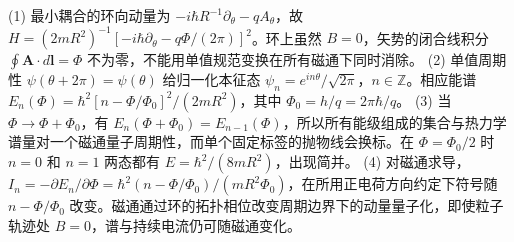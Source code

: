 (1) 最小耦合的环向动量为 \(-i\hbar R^{-1}\partial_\theta-qA_\theta\)，故 \(H=(2mR^2)^{-1}[-i\hbar\partial_\theta-q\Phi/(2\pi)]^2\)。环上虽然 \(B=0\)，矢势的闭合线积分 \(\oint\mathbf A\cdot d\mathbf l=\Phi\) 不为零，不能用单值规范变换在所有磁通下同时消除。
(2) 单值周期性 \(\psi(\theta+2\pi)=\psi(\theta)\) 给归一化本征态 \(\psi_n=e^{in\theta}/\sqrt{2\pi}\)，\(n\in\mathbb Z\)。相应能谱 \(E_n(\Phi)=\hbar^2[n-\Phi/\Phi_0]^2/(2mR^2)\)，其中 \(\Phi_0=h/q=2\pi\hbar/q\)。
(3) 当 \(\Phi\to\Phi+\Phi_0\)，有 \(E_n(\Phi+\Phi_0)=E_{n-1}(\Phi)\)，所以所有能级组成的集合与热力学谱量对一个磁通量子周期性，而单个固定标签的抛物线会换标。在 \(\Phi=\Phi_0/2\) 时 \(n=0\) 和 \(n=1\) 两态都有 \(E=\hbar^2/(8mR^2)\)，出现简并。
(4) 对磁通求导，\(I_n=-\partial E_n/\partial\Phi=\hbar^2(n-\Phi/\Phi_0)/(mR^2\Phi_0)\)，在所用正电荷方向约定下符号随 \(n-\Phi/\Phi_0\) 改变。磁通通过环的拓扑相位改变周期边界下的动量量子化，即使粒子轨迹处 \(B=0\)，谱与持续电流仍可随磁通变化。
